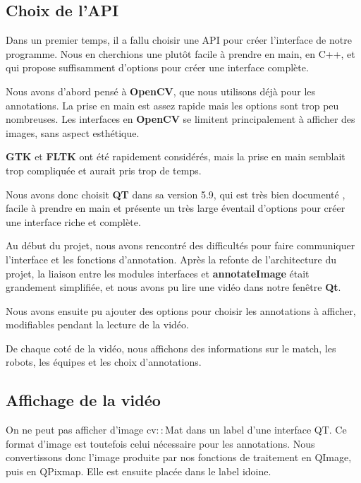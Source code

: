\subsection{Choix de l'API}

Dans un premier temps, il a fallu choisir une API pour créer
l'interface de notre programme. Nous en cherchions une plutôt
facile à prendre en main, en C++, et qui propose suffisamment
d'options pour créer une interface complète. 
\bigskip

Nous avons d'abord pensé à \textbf{OpenCV}, que nous utilisons
déjà pour les annotations. La prise en main est assez rapide mais
les options sont trop peu nombreuses. Les interfaces en
\textbf{OpenCV} se limitent principalement à afficher des images,
sans aspect esthétique. 

\bigskip

\textbf{GTK} et \textbf{FLTK} ont été rapidement considérés, mais
la prise en main semblait trop compliquée et aurait pris trop de
temps. 

\bigskip

Nous avons donc choisit \textbf{QT} dans sa version 5.9, qui est
très bien documenté \cite{ref4}, facile à prendre en main et
présente un très large éventail d'options pour créer une
interface riche et complète.

\bigskip

Au début du projet, nous avons rencontré des difficultés pour
faire communiquer l'interface et les fonctions d'annotation.
Après la refonte de l'architecture du projet, la liaison entre
les modules interfaces et \textbf{annotateImage} était grandement
simplifiée, et nous avons pu lire une vidéo dans notre fenêtre
\textbf{Qt}. 
\bigskip

Nous avons ensuite pu ajouter des options pour choisir les
annotations à afficher, modifiables pendant la lecture de la
vidéo. 
\bigskip

De chaque coté de la vidéo, nous affichons des informations sur
le match, les robots, les équipes et les choix d'annotations.
\bigskip

\subsection{Affichage de la vidéo}

On ne peut pas afficher d'image cv$::$Mat dans un label d'une
interface QT. Ce format d'image est toutefois celui nécessaire
pour les annotations. Nous convertissons donc l'image produite
par nos fonctions de traitement en QImage, puis en QPixmap. Elle
est ensuite placée dans le label idoine.

